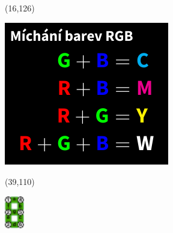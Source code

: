 \documentclass{extarticle}
\begin{document}
\begin{textblock}{27.2}(16,126)
\vfill
{\centerline{\includegraphics[scale=0.6333]{tools/mixing-rgb.pdf}}} 
\vfill
\end{textblock}

\begin{textblock}{0}(39,110)
\vfill
{\centerline{\includegraphics[height=14mm]{tools/images/segment-numbering.pdf}}} 
\vfill
\end{textblock}
\end{document}

